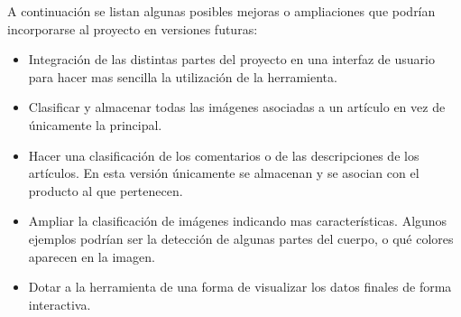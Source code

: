 A continuación se listan algunas posibles mejoras o ampliaciones que podrían incorporarse al proyecto en versiones futuras:

\begin{itemize}
    \item Integración de las distintas partes del proyecto en una interfaz de usuario para hacer mas sencilla la utilización de la herramienta.
    \item Clasificar y almacenar todas las imágenes asociadas a un artículo en vez de únicamente la principal.
    \item Hacer una clasificación de los comentarios o de las descripciones de los artículos. En esta versión únicamente se almacenan y se asocian con el producto al que pertenecen.
    \item Ampliar la clasificación de imágenes indicando mas características. Algunos ejemplos podrían ser la detección de algunas partes del cuerpo, o qué colores aparecen en la imagen.
    \item Dotar a la herramienta de una forma de visualizar los datos finales de forma interactiva.
\end{itemize}
